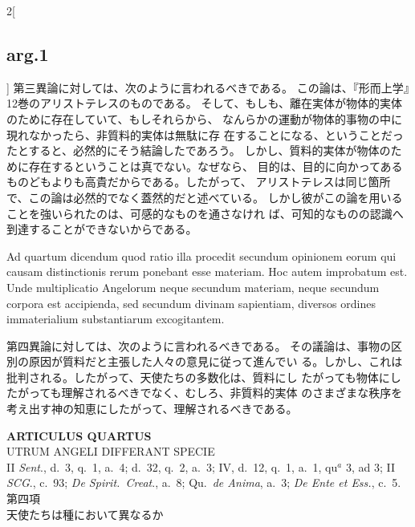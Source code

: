 \documentclass[paper=a4paper,fontsize=10pt,jafontsize=9pt,titlepage]{jlreq}
\begin{document}
\begin{paracol}{2}[\subsection{arg.1}]
第三異論に対しては、次のように言われるべきである。
この論は、『形而上学』12巻のアリストテレスのものである。
そして、もしも、離在実体が物体的実体のために存在していて、もしそれらから、
 なんらかの運動が物体的事物の中に現れなかったら、非質料的実体は無駄に存
 在することになる、ということだったとすると、必然的にそう結論したであろう。
しかし、質料的実体が物体のために存在するということは真でない。なぜなら、
 目的は、目的に向かってあるものどもよりも高貴だからである。したがって、
 アリストテレスは同じ箇所で、この論は必然的でなく蓋然的だと述べている。
 しかし彼がこの論を用いることを強いられたのは、可感的なものを通さなけれ
 ば、可知的なものの認識へ到達することができないからである。

\switchcolumn*[\subsection{ad.4}]

Ad quartum dicendum quod ratio illa procedit
secundum opinionem eorum qui causam distinctionis rerum ponebant esse
materiam. Hoc autem improbatum est. Unde multiplicatio Angelorum neque
secundum materiam, neque secundum corpora est accipienda, sed secundum
divinam sapientiam, diversos ordines immaterialium substantiarum
excogitantem.

\switchcolumn

第四異論に対しては、次のように言われるべきである。
その議論は、事物の区別の原因が質料だと主張した人々の意見に従って進んでい
 る。しかし、これは批判される。したがって、天使たちの多数化は、質料にし
 たがっても物体にしたがっても理解されるべきでなく、むしろ、非質料的実体
 のさまざまな秩序を考え出す神の知恵にしたがって、理解されるべきである。

\end{paracol}


\newpage

{}
\setcounter{section}{4}
\setcounter{subsection}{0}
\begin{center}
 {\Large {\bfseries ARTICULUS QUARTUS}}\\
 {\large UTRUM ANGELI DIFFERANT SPECIE}\\
 {\footnotesize II {\itshape Sent}., d.~3, q.~1, a.~4; d.~32, q.~2,
 a.~3; IV, d.~12, q.~1, a.~1, qu$^a$ 3, ad 3; II {\itshape SCG}., c.~93;
 {\itshape De Spirit.~Creat}., a.~8; Qu.~{\itshape de Anima}, a.~3;
 {\itshape De Ente et Ess.}, c.~5.}\\
 {\Large 第四項\\天使たちは種において異なるか}
\end{center}
\end{document}
